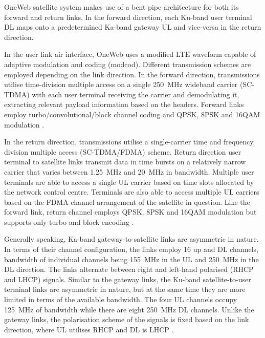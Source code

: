 \documentclass[english, 12pt, a4paper, elec, utf8, a-1b, online]{aaltothesis}
\begin{document}
OneWeb satellite system makes use of a bent pipe architecture for both its forward and return links. In the forward direction, each Ku-band user terminal DL maps onto a predetermined Ka-band gateway UL and vice-versa in the return direction. \cite{worldvu2016loi, portillo2019technical}

In the user link air interface, OneWeb uses a modified LTE waveform capable of adaptive modulation and coding (modcod).
Different transmission schemes are employed depending on the link direction.
In the forward direction, transmissions utilise time-division multiple access on a single \SI{250}{\mega\hertz} wideband carrier (SC-TDMA) with each user terminal receiving the carrier and demodulating it, extracting relevant payload information based on the headers. Forward links employ turbo/convolutional/block
channel coding and QPSK, 8PSK and 16QAM modulation \cite{allen2022terrestrial, worldvu2016loi}.

In the return direction, transmissions utilise a single-carrier time and frequency division multiple access (SC-TDMA/FDMA) scheme.
Return direction user terminal to satellite links transmit data in time bursts on a relatively narrow carrier that varies between \SI{1.25}{\mega\hertz} and \SI{20}{\mega\hertz} in bandwidth.
Multiple user terminals are able to access a single UL carrier based on time slots allocated by the network control centre.
Terminals are also able to access multiple UL carriers based on the FDMA channel arrangement of the satellite in question. Like the forward link,
return channel employs QPSK, 8PSK and 16QAM modulation but supports only turbo and block encoding \cite{allen2022terrestrial,worldvu2016loi}.

Generally speaking, Ka-band gateway-to-satellite links are asymmetric in nature. In terms of their channel configuration, the links employ 16 up and DL channels, bandwidth of individual channels being \SI{155}{\mega\hertz} in the UL and \SI{250}{\mega\hertz} in the DL direction. The links alternate between right and left-hand polarised (RHCP and LHCP) signals.
Similar to the gateway links, the Ku-band satellite-to-user terminal links are asymmetric in nature, but at the same time they are more limited in terms of the available bandwidth.
The four UL channels occupy \SI{125}{\mega\hertz} of bandwidth while there are eight \SI{250}{\mega\hertz} DL channels.
Unlike the gateway links, the polarisation scheme of the signals is fixed based on the link direction, where UL utilises RHCP and DL is LHCP \cite{portillo2019technical,allen2022terrestrial}.
\end{document}
